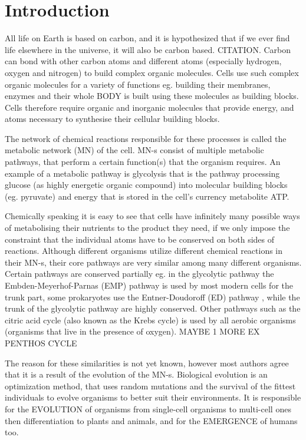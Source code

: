 \documentclass[10pt,a4paper]{article}
\begin{document}
	\section{Introduction}

	All life on Earth is based on carbon, and it is hypothesized that if we ever find life elsewhere in the universe, it will also be carbon based. CITATION. Carbon can bond with other carbon atoms and different atoms (especially hydrogen, oxygen and nitrogen) to build complex organic molecules. Cells use such complex organic molecules for a variety of functions eg. building their membranes, enzymes and their whole BODY is built using these molecules as building blocks. Cells therefore require organic and inorganic molecules that provide energy, and atoms necessary to synthesise their cellular building blocks.

	The network of chemical reactions responsible for these processes is called the metabolic network (MN) of the cell. MN-s consist of multiple metabolic pathways, that perform a certain function(s) that the organism requires. An example of a metabolic pathway is glycolysis that is the pathway processing glucose (as highly energetic organic compound) into molecular building blocks (eg. pyruvate) and energy that is stored in the cell's currency metabolite ATP.
	
	Chemically speaking it is easy to see that cells have  infinitely many possible ways of metabolising their nutrients to the product they need, if we only impose the constraint that the individual atoms have to be conserved on both sides of reactions. Although different organisms utilize different chemical reactions in their MN-s, their core pathways are very similar among many different organisms. Certain pathways are conserved partially  eg. in the glycolytic pathway the Embden-Meyerhof-Parnas (EMP) pathway \cite{EMPpathway} is used by most modern cells for the trunk part,  some prokaryotes  use the Entner-Doudoroff (ED) pathway \cite{EDpathway}, while the trunk of the glycolytic pathway are highly conserved. Other pathways such as the citric acid cycle (also known as the Krebs cycle) is used by all aerobic organisms (organisms that live in the presence of oxygen). MAYBE 1 MORE EX PENTHOS CYCLE

	The reason for these similarities is not yet known, however most authors agree that it is a result of the evolution of the MN-s. 
	Biological evolution is an optimization method, that uses random mutations and the survival of the fittest individuals to evolve organisms to better suit their environments. It is responsible for the EVOLUTION of organisms from single-cell organisms to multi-cell ones then differentiation to plants and animals, and for the EMERGENCE of humans too. 
\end{document}
